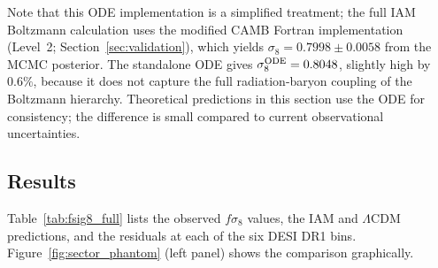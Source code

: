 \documentclass[12pt,a4paper]{article}
\newcommand{\lcdm}{$\Lambda$CDM}
\begin{document}
Note that this ODE implementation is a simplified treatment; the full
IAM Boltzmann calculation uses the modified CAMB Fortran implementation
(Level~2; Section~\ref{sec:validation}), which yields
$\sigma_8 = 0.7998 \pm 0.0058$ from the MCMC posterior.
The standalone ODE gives $\sigma_8^{\rm ODE} = 0.8048$, slightly high
by $0.6\%$, because it does not capture the full radiation-baryon
coupling of the Boltzmann hierarchy.
Theoretical predictions in this section use the ODE for consistency;
the difference is small compared to current observational uncertainties.

\subsection{Results}
\label{sec:fsig8_results}

Table~\ref{tab:fsig8_full} lists the observed $f\sigma_8$ values,
the IAM and \lcdm{} predictions, and the residuals at each of the
six DESI DR1 bins.
Figure~\ref{fig:sector_phantom} (left panel) shows the comparison graphically.
\end{document}
